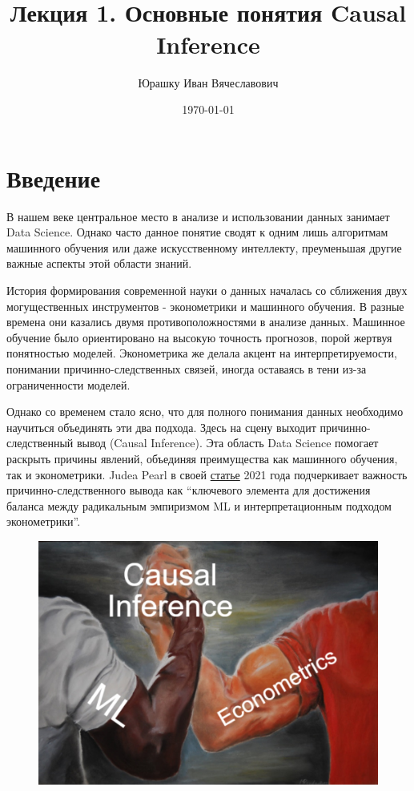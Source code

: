

\title{
    \textbf{\coursename}\\
    Лекция 1.
    Основные понятия Causal Inference
}
\author{Юрашку Иван Вячеславович}
\date{\today}


    \maketitle
    \section*{Введение}
        В нашем веке центральное место в анализе и использовании данных занимает Data Science.
        Однако часто данное понятие сводят к одним лишь алгоритмам машинного обучения или даже искусственному интеллекту, преуменьшая другие важные аспекты этой области знаний.

        История формирования современной науки о данных началась со сближения двух могущественных инструментов - эконометрики и машинного обучения.
        В разные времена они казались двумя противоположностями в анализе данных.
        Машинное обучение было ориентировано на высокую точность прогнозов, порой жертвуя понятностью моделей.
        Эконометрика же делала акцент на интерпретируемости, понимании причинно-следственных связей, иногда оставаясь в тени из-за ограниченности моделей.

        Однако со временем стало ясно, что для полного понимания данных необходимо научиться объединять эти два подхода.
        Здесь на сцену выходит причинно-следственный вывод (Causal Inference).
        Эта область Data Science помогает раскрыть причины явлений, объединяя преимущества как машинного обучения, так и эконометрики.
        Judea Pearl в своей \href{https://www.degruyter.com/document/doi/10.1515/jci-2021-0006/html}{статье} 2021 года подчеркивает важность причинно-следственного вывода как “ключевого элемента для достижения баланса между радикальным эмпиризмом ML и интерпретационным подходом эконометрики”.

        \begin{figure}[h]
            \centering
            \includegraphics[width=0.7\linewidth]{imgs/epic_CI}
            \label{fig:mpr}
        \end{figure}
        \newpage

